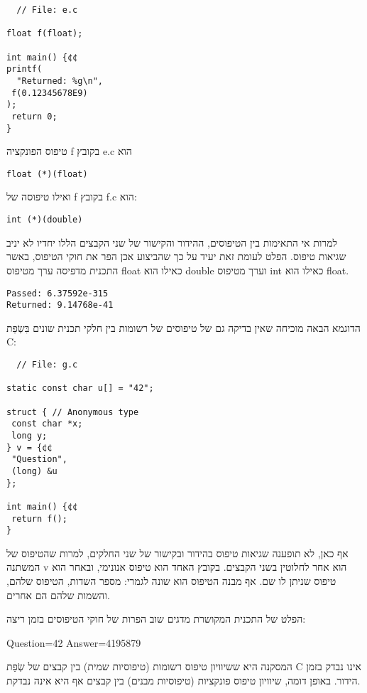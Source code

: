 \begin{verbatim}
  // File: e.c

float f(float);

int main() {¢¢
printf(
  "Returned: %g\n",
 f(0.12345678E9)
);
 return 0;
}

\end{verbatim}

      טיפוס הפונקציה f בקובץ e.c הוא

\begin{verbatim}
float (*)(float)
\end{verbatim}

      ואילו טיפוסה של f בקובץ f.c הוא:
\begin{verbatim}
int (*)(double)
\end{verbatim}

      למרות אי התאימות בין הטיפוסים, ההידור והקישור של שני הקבצים הללו יחדיו לא יניב
      שגיאות טיפוס. הפלט לעומת זאת יעיד על כך שהביצוע אכן הפר את חוקי הטיפוס, באשר
      התכנית מדפיסה ערך מטיפוס float כאילו הוא double וערך מטיפוס int כאילו הוא
      float.

\begin{verbatim}
Passed: 6.37592e-315
Returned: 9.14768e-41
\end{verbatim}

      הדוגמא הבאה מוכיחה שאין בדיקה גם של טיפוסים של רשומות בין חלקי תכנית שונים בִּשְׂפַת C:

\begin{verbatim}
  // File: g.c

static const char u[] = "42";

struct { // Anonymous type
 const char *x;
 long y;
} v = {¢¢
 "Question",
 (long) &u
};

int main() {¢¢
 return f();
}
\end{verbatim}

      אף כאן, לא תופענה שגיאות טיפוס בהידור ובקישור של שני החלקים, למרות שהטיפוס של המשתנה v הוא אחר לחלוטין בשני הקבצים. בקובץ האחד הוא טיפוס אנונימי, ובאחר הוא טיפוס שניתן לו שם. אף מבנה הטיפוס הוא שונה לגמרי: מספר השדות, הטיפוס שלהם, והשמות שלהם הם אחרים.

      הפלט של התכנית המקושרת מדגים שוב הפרות של חוקי הטיפוסים בזמן ריצה:

      Question=42
      Answer=4195879

      המסקנה היא ששיוויון טיפוס רשומות (טיפוסיות שמית) בין קבצים של שְׂפַת C אינו נבדק בזמן הידור. באופן דומה, שיוויון טיפוס פונקציות (טיפוסיות מבנים) בין קבצים אף היא אינה נבדקת.

